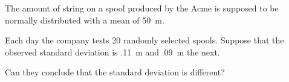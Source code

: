 \begin{frame}

  \begin{block}{\examplectd}
  The amount of string on a spool produced by the Acme is supposed to be normally distributed with a mean of 50~m. 
  
  \medskip
  
  Each day the company tests 20 randomly selected spools. Suppose that the observed standard deviation is .11~m and .09~m the next.
  
  \medskip
  
  Can they conclude that the standard deviation is different?
  \end{block}
\end{frame}



\begin{frame}
  \begin{block}{\examplectd}
  \begin{center}
  \end{center}
  \end{block}
\end{frame}

